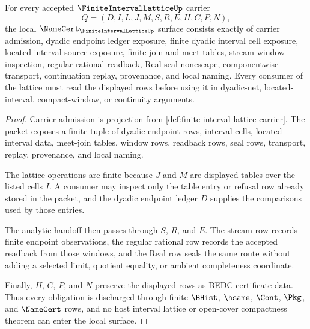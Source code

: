 \begin{theorem}
\label{thm:finite-interval-lattice-namecert-obligations}
For every accepted $\FiniteIntervalLatticeUp$ carrier
$$
Q=(D,I,L,J,M,S,R,E,H,C,P,N),
$$
the local $\NameCert_{\FiniteIntervalLatticeUp}$ surface consists exactly of carrier admission, dyadic endpoint ledger exposure, finite dyadic interval cell exposure, located-interval source exposure, finite join and meet tables, stream-window inspection, regular rational readback, Real seal nonescape, componentwise transport, continuation replay, provenance, and local naming. Every consumer of the lattice must read the displayed rows before using it in dyadic-net, located-interval, compact-window, or continuity arguments.
\end{theorem}
\begin{proof}
Carrier admission is projection from \autoref{def:finite-interval-lattice-carrier}. The packet exposes a finite tuple of dyadic endpoint rows, interval cells, located interval data, meet-join tables, window rows, readback rows, seal rows, transport, replay, provenance, and local naming.

The lattice operations are finite because $J$ and $M$ are displayed tables over the listed cells $I$. A consumer may inspect only the table entry or refusal row already stored in the packet, and the dyadic endpoint ledger $D$ supplies the comparisons used by those entries.

The analytic handoff then passes through $S$, $R$, and $E$. The stream row records finite endpoint observations, the regular rational row records the accepted readback from those windows, and the Real row seals the same route without adding a selected limit, quotient equality, or ambient completeness coordinate.

Finally, $H$, $C$, $P$, and $N$ preserve the displayed rows as BEDC certificate data. Thus every obligation is discharged through finite $\BHist$, $\hsame$, $\Cont$, $\Pkg$, and $\NameCert$ rows, and no host interval lattice or open-cover compactness theorem can enter the local surface.
\end{proof}

